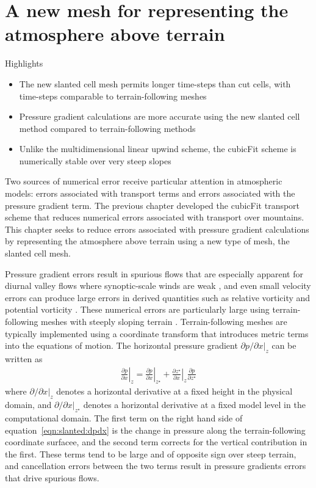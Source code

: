 \chapter{A new mesh for representing the atmosphere above terrain}
\label{ch:slanted}

\begin{highlights}
{\Large Highlights}
\begin{itemize}
	\item The new slanted cell mesh permits longer time-steps than cut cells, with time-steps comparable to terrain-following meshes
	\item Pressure gradient calculations are more accurate using the new slanted cell method compared to terrain-following methods
	\item Unlike the multidimensional linear upwind scheme, the cubicFit scheme is numerically stable over very steep slopes
\end{itemize}
\end{highlights}

Two sources of numerical error receive particular attention in atmospheric models: errors associated with transport terms and errors associated with the pressure gradient term.
The previous chapter developed the cubicFit transport scheme that reduces numerical errors associated with transport over mountains.
This chapter seeks to reduce errors associated with pressure gradient calculations by representing the atmosphere above terrain using a new type of mesh, the slanted cell mesh.

Pressure gradient errors result in spurious flows that are especially apparent for diurnal valley flows where synoptic-scale winds are weak \citep{fast2003}, and even small velocity errors can produce large errors in derived quantities such as relative vorticity and potential vorticity \citep{hoinka-zaengl2004}.
These numerical errors are particularly large using terrain-following meshes with steeply sloping terrain \citep{zaengl2012}.
Terrain-following meshes are typically implemented using a coordinate transform that introduces metric terms into the equations of motion.  The horizontal pressure gradient $\left. \partial p / \partial x \right|_z$ can be written as \citep{mahrer1984}
\begin{align}
	\left. \frac{\partial p}{\partial x} \right|_z = 
	\left. \frac{\partial p}{\partial x} \right|_{z^\star} +
	\left. \frac{\partial z^\star}{\partial x} \right|_z
	\frac{\partial p}{\partial z^\star} \label{eqn:slanted:dpdx}
\end{align}
where $\left. \partial / \partial x \right|_z$ denotes a horizontal derivative at a fixed height in the physical domain, and $\left. \partial / \partial x \right|_{z^\star}$ denotes a horizontal derivative at a fixed model level in the computational domain.  The first term on the right hand side of equation~\eqref{eqn:slanted:dpdx} is the change in pressure along the terrain-following coordinate surfacee, and the second term corrects for the vertical contribution in the first.
These terms tend to be large and of opposite sign over steep terrain, and cancellation errors between the two terms result in pressure gradients errors that drive spurious flows.

